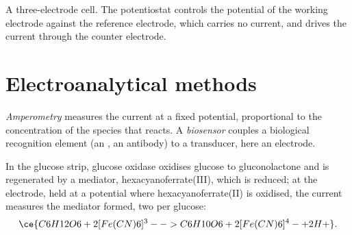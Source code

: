 \begin{omfigure}

{\small A three-electrode cell. The potentiostat controls the potential of the
working electrode against the reference electrode, which carries no current,
and drives the current through the counter electrode.}
\end{omfigure}

\section{Electroanalytical methods}

\begin{definition}\label{def:b3:electrode-kinetics:amperometry}
\emph{Amperometry} measures the current at a fixed potential,
proportional to the concentration of the species that reacts. A
\emph{biosensor} couples a biological recognition element (an
, an antibody) to a transducer, here an electrode.
\end{definition}

In the glucose strip, glucose oxidase oxidises glucose to gluconolactone and
is regenerated by a mediator, hexacyanoferrate(III), which is reduced; at the
electrode, held at a potential where hexacyanoferrate(II) is oxidised, the
current measures the mediator formed, two per glucose:
\[
  \ce{C6H12O6 + 2 [Fe(CN)6]^3- -> C6H10O6 + 2 [Fe(CN)6]^4- + 2 H+} .
\]

